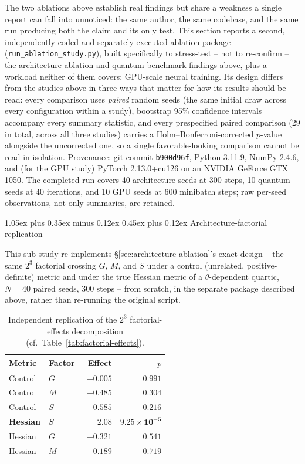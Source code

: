 \documentclass[10pt,twocolumn]{article}
\makeatletter
\renewcommand\subsection{\@startsection{subsection}{2}{0pt}%
  {1.05ex plus 0.35ex minus 0.12ex}%
  {0.45ex plus 0.12ex}%
  {\normalsize\bfseries}}
\makeatother
\begin{document}
The two ablations above establish real findings but share a weakness a single
report can fall into unnoticed: the same author, the same codebase, and the
same run producing both the claim and its only test. This section reports a
second, independently coded and separately executed ablation package
(\texttt{run\_ablation\_study.py}), built specifically to stress-test --
not to re-confirm -- the architecture-ablation and quantum-benchmark
findings above, plus a workload neither of them covers: GPU-scale neural
training. Its design differs from the studies above in three ways that
matter for how its results should be read: every comparison uses
\emph{paired} random seeds (the same initial draw across every configuration
within a study), bootstrap 95\% confidence intervals accompany every summary
statistic, and every prespecified paired comparison (29 in total, across all
three studies) carries a Holm--Bonferroni-corrected $p$-value alongside the
uncorrected one, so a single favorable-looking comparison cannot be read in
isolation. Provenance: git commit \texttt{b900d96f}, Python 3.11.9, NumPy
2.4.6, and (for the GPU study) PyTorch 2.13.0+cu126 on an NVIDIA GeForce GTX
1050. The completed run covers 40 architecture seeds at 300 steps, 10 quantum
seeds at 40 iterations, and 10 GPU seeds at 600 minibatch steps; raw per-seed
observations, not only summaries, are retained.

\subsection{Architecture-factorial replication}
\label{sec:ext-architecture}

This sub-study re-implements \S\ref{sec:architecture-ablation}'s exact
design -- the same $2^3$ factorial crossing $G$, $M$, and $S$ under a
control (unrelated, positive-definite) metric and under the true Hessian
metric of a $\theta$-dependent quartic, $N=40$ paired seeds, 300 steps --
from scratch, in the separate package described above, rather than re-running
the original script.

\begin{table}[t]
\centering\small
\begin{tabular}{@{}llrr@{}}
\toprule
Metric & Factor & Effect & $p$ \\
\midrule
Control & $G$ & $-0.005$ & $0.991$ \\
Control & $M$ & $-0.485$ & $0.304$ \\
Control & $S$ & $\phantom{-}0.585$ & $0.216$ \\
\textbf{Hessian} & \textbf{$S$} & \textbf{$2.08$} & $\mathbf{9.25\times10^{-5}}$ \\
Hessian & $G$ & $-0.321$ & $0.541$ \\
Hessian & $M$ & $\phantom{-}0.189$ & $0.719$ \\
\bottomrule
\end{tabular}
\caption{Independent replication of the $2^3$ factorial-effects decomposition
(cf.\ Table~\ref{tab:factorial-effects}).}
\label{tab:ext-factorial-effects}
\end{table}
\end{document}

